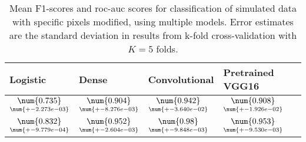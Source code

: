 \begin{table}
\centering
\caption{
Mean F1-scores and roc-auc scores for classification of simulated data with specific pixels
modified, using multiple models. Error estimates are the standard deviation in results from 
k-fold cross-validation with $K=5$ folds.
}
\label{tab:classification-simulated-pixelmod-f1-auc}
\begin{tabular}{llll}
\toprule
                                           Logistic &                                               Dense &                                       Convolutional &                                    Pretrained VGG16 \\
\midrule
 $\underset{\num{+- 2.273e-03 }  }{\num{ 0.735 } }$ &  $\underset{\num{+- 8.276e-03 }  }{\num{ 0.904 } }$ &  $\underset{\num{+- 3.640e-02 }  }{\num{ 0.942 } }$ &  $\underset{\num{+- 1.926e-02 }  }{\num{ 0.908 } }$ \\
 $\underset{\num{+- 9.779e-04 }  }{\num{ 0.832 } }$ &  $\underset{\num{+- 2.604e-03 }  }{\num{ 0.952 } }$ &  $\underset{\num{+- 9.848e-03 }  }{\num{ 0.98 } }$ &  $\underset{\num{+- 9.530e-03 }  }{\num{ 0.953 } }$ \\
\bottomrule
\end{tabular}
\end{table}
